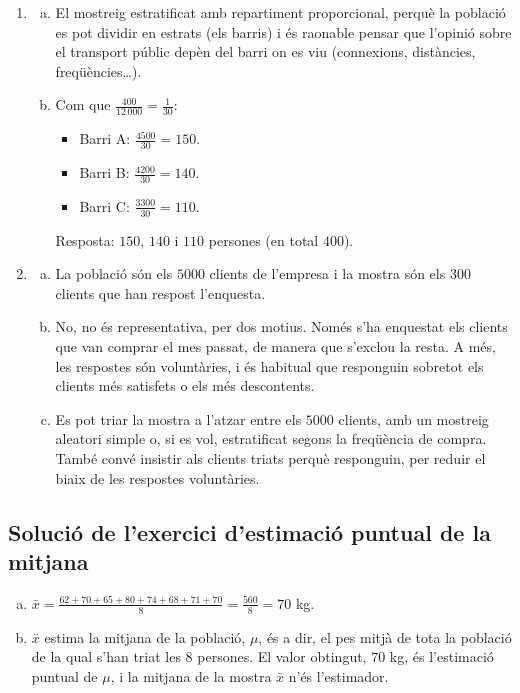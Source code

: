 \begin{enumerate}
 \item
 \begin{enumerate}[a)]
  \item El mostreig estratificat amb repartiment proporcional, perquè la població es pot dividir en estrats (els barris) i és raonable pensar que l'opinió sobre el transport públic depèn del barri on es viu (connexions, distàncies, freqüències\ldots).
  \item Com que $\frac{400}{12\,000}=\frac{1}{30}$:
  \begin{itemize}
   \item Barri A: $\frac{4500}{30}=150$.
   \item Barri B: $\frac{4200}{30}=140$.
   \item Barri C: $\frac{3300}{30}=110$.
  \end{itemize}
  Resposta: $150$, $140$ i $110$ persones (en total $400$).
 \end{enumerate}

 \item
 \begin{enumerate}[a)]
  \item La població són els $5000$ clients de l'empresa i la mostra són els $300$ clients que han respost l'enquesta.
  \item No, no és representativa, per dos motius. Només s'ha enquestat els clients que van comprar el mes passat, de manera que s'exclou la resta. A més, les respostes són voluntàries, i és habitual que responguin sobretot els clients més satisfets o els més descontents.
  \item Es pot triar la mostra a l'atzar entre els $5000$ clients, amb un mostreig aleatori simple o, si es vol, estratificat segons la freqüència de compra. També convé insistir als clients triats perquè responguin, per reduir el biaix de les respostes voluntàries.
 \end{enumerate}
\end{enumerate}


\subsection{Solució de l'exercici d'estimació puntual de la mitjana}
\begin{enumerate}[a)]
 \item $\bar{x}=\frac{62+70+65+80+74+68+71+70}{8}=\frac{560}{8}=70$ kg.
 \item $\bar{x}$ estima la mitjana de la població, $\mu$, és a dir, el pes mitjà de tota la població de la qual s'han triat les $8$ persones. El valor obtingut, $70$ kg, és l'estimació puntual de $\mu$, i la mitjana de la mostra $\bar{x}$ n'és l'estimador.
\end{enumerate}


